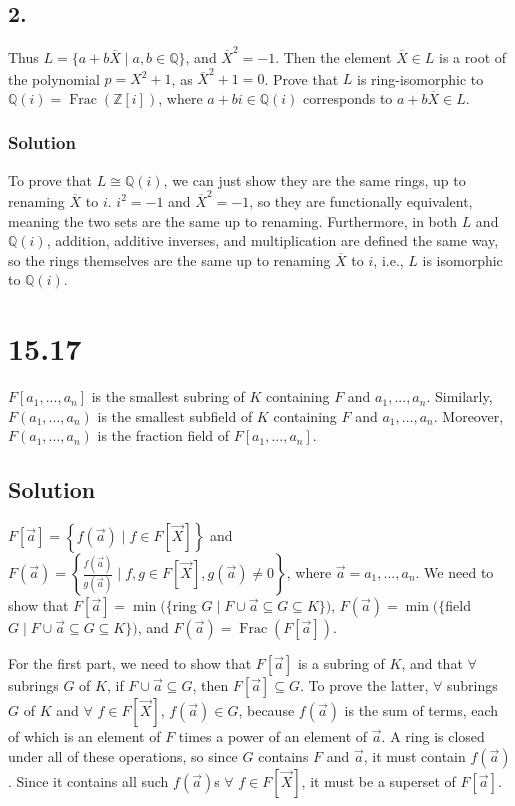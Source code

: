 \documentclass[fleqn]{article}
\DeclareMathOperator{\Frac}{Frac}
\begin{document}
        \subsection{2.}
        Thus $L = \{a + b\overline{X} \mid a, b \in \mathbb{Q}\}$, and $\overline{X}^2 = -1$.  Then the element $\overline{X} \in L$ is a root of the polynomial $p = X^2 + 1$, as $\overline{X}^2 + 1 = 0$.  Prove that $L$ is ring-isomorphic to $\mathbb{Q}(i) = \Frac(\mathbb{Z}[i])$, where $a + bi \in \mathbb{Q}(i)$ corresponds to $a + b\overline{X} \in L$.
        
            \subsubsection{Solution}
            To prove that $L \cong \mathbb{Q}(i)$, we can just show they are the same rings, up to renaming $\overline{X}$ to $i$.  $i^2 = -1$ and $\overline{X}^2 = -1$, so they are functionally equivalent, meaning the two sets are the same up to renaming.  Furthermore, in both $L$ and $\mathbb{Q}(i)$, addition, additive inverses, and multiplication are defined the same way, so the rings themselves are the same up to renaming $\overline{X}$ to $i$, i.e., $L$ is isomorphic to $\mathbb{Q}(i)$.
    
    \section{15.17}
    $F[a_1, ..., a_n]$ is the smallest subring of $K$ containing $F$ and $a_1, ..., a_n$.  Similarly, $F(a_1, ..., a_n)$ is the smallest subfield of $K$ containing $F$ and $a_1, ..., a_n$.  Moreover, $F(a_1, ..., a_n)$ is the fraction field of $F[a_1, ..., a_n]$.
    
        \subsection{Solution}
        $F[\vec{a}] = \left\{f(\vec{a}) \mid f \in F[\vec{X}]\right\}$ and $F(\vec{a}) = \left\{\frac{f(\vec{a})}{g(\vec{a})} \mid f, g \in F[\vec{X}], g(\vec{a}) \neq 0\right\}$, where $\vec{a} = a_1, ..., a_n$.  We need to show that $F[\vec{a}] = \min(\{$ring $G \mid F \cup \vec{a} \subseteq G \subseteq K\})$, $F(\vec{a}) = \min(\{$field $G \mid F \cup \vec{a} \subseteq G \subseteq K\})$, and $F(\vec{a}) = \Frac(F[\vec{a}])$.
        
        For the first part, we need to show that $F[\vec{a}]$ is a subring of $K$, and that $\forall$ subrings $G$ of $K$, if $F \cup \vec{a} \subseteq G$, then $F[\vec{a}] \subseteq G$.  To prove the latter, $\forall$ subrings $G$ of $K$ and $\forall$ $f \in F[\vec{X}]$, $f(\vec{a}) \in G$, because $f(\vec{a})$ is the sum of terms, each of which is an element of $F$ times a power of an element of $\vec{a}$.  A ring is closed under all of these operations, so since $G$ contains $F$ and $\vec{a}$, it must contain $f(\vec{a})$.  Since it contains all such $f(\vec{a})$s $\forall$ $f \in F[\vec{X}]$, it must be a superset of $F[\vec{a}]$.
        
\end{document}
